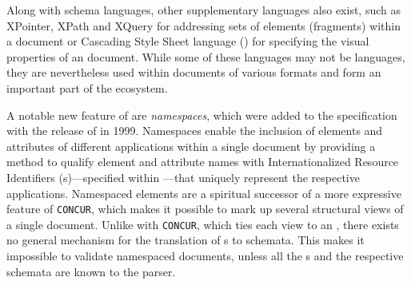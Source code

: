 \documentclass{book}
\begin{document}
        Along with schema languages, other supplementary languages also exist,
        such as XPointer, XPath and XQuery for addressing sets of elements
        (fragments) within a  document or Cascading Style Sheet
        language () for specifying the visual properties of an
         document. While some of these languages may not be
         languages, they are nevertheless used within documents of
        various  formats and form an important part of the
         ecosystem.

        A notable new feature of  are \emph{namespaces}, which
        were added to the specification with the release of \cite{bray99} in
        1999. Namespaces enable the inclusion of elements and attributes of
        different  applications within a single 
        document by providing a method to qualify element and attribute names
        with Internationalized Resource Identifiers (s)---specified
        within \cite{rfc3987}---that uniquely represent the respective
         applications. Namespaced elements are a spiritual
        successor of a more expressive  feature of
        \texttt{CONCUR}, which makes it possible to mark up several structural
        views of a single document. Unlike with \texttt{CONCUR}, which ties each
        view to an  , there exists no general
        mechanism for the translation of s to 
        schemata. This makes it impossible to validate namespaced 
        documents, unless all the s and the respective schemata are
        known to the parser.
\end{document}
